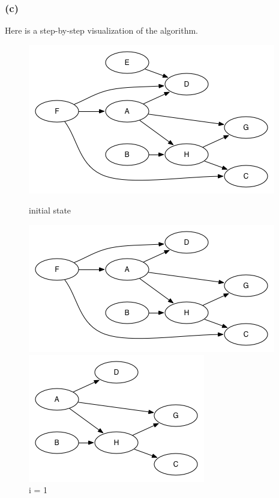 \documentclass[11pt,a4paper]{article}
\begin{document}
  \subsubsection*{(c)} 
  Here is a step-by-step visualization of the algorithm.\\
  \begin{figure}[h]
  	\begin{minipage}[t]{4 cm}
		\includegraphics[width=\linewidth]{101c0}
		\caption{initial state}
  	\end{minipage}
  	\begin{minipage}[t]{4 cm}
		\includegraphics[width=\linewidth]{101c1}
		\caption{i = 1}
  	\end{minipage}
  	\begin{minipage}[t]{4 cm}
		\includegraphics[width=\linewidth]{101c2}

\end{minipage}
\end{figure}
\end{document}

